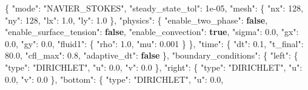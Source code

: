 \documentclass[
  10pt,
]{article}
\newenvironment{Shaded}{}{}
\newcommand{\DataTypeTok}[1]{\textcolor[rgb]{0.56,0.13,0.00}{#1}}
\newcommand{\DecValTok}[1]{\textcolor[rgb]{0.25,0.63,0.44}{#1}}
\newcommand{\FloatTok}[1]{\textcolor[rgb]{0.25,0.63,0.44}{#1}}
\newcommand{\FunctionTok}[1]{\textcolor[rgb]{0.02,0.16,0.49}{#1}}
\newcommand{\KeywordTok}[1]{\textcolor[rgb]{0.00,0.44,0.13}{\textbf{#1}}}
\newcommand{\StringTok}[1]{\textcolor[rgb]{0.25,0.44,0.63}{#1}}
\begin{document}
\begin{Shaded}
\begin{Highlighting}[]
\FunctionTok{\{}
  \DataTypeTok{"mode"}\FunctionTok{:} \StringTok{"NAVIER\_STOKES"}\FunctionTok{,}
  \DataTypeTok{"steady\_state\_tol"}\FunctionTok{:} \DecValTok{1e{-}05}\FunctionTok{,}
  \DataTypeTok{"mesh"}\FunctionTok{:} \FunctionTok{\{}
    \DataTypeTok{"nx"}\FunctionTok{:} \DecValTok{128}\FunctionTok{,}
    \DataTypeTok{"ny"}\FunctionTok{:} \DecValTok{128}\FunctionTok{,}
    \DataTypeTok{"lx"}\FunctionTok{:} \FloatTok{1.0}\FunctionTok{,}
    \DataTypeTok{"ly"}\FunctionTok{:} \FloatTok{1.0}
  \FunctionTok{\},}
  \DataTypeTok{"physics"}\FunctionTok{:} \FunctionTok{\{}
    \DataTypeTok{"enable\_two\_phase"}\FunctionTok{:} \KeywordTok{false}\FunctionTok{,}
    \DataTypeTok{"enable\_surface\_tension"}\FunctionTok{:} \KeywordTok{false}\FunctionTok{,}
    \DataTypeTok{"enable\_convection"}\FunctionTok{:} \KeywordTok{true}\FunctionTok{,}
    \DataTypeTok{"sigma"}\FunctionTok{:} \FloatTok{0.0}\FunctionTok{,}
    \DataTypeTok{"gx"}\FunctionTok{:} \FloatTok{0.0}\FunctionTok{,}
    \DataTypeTok{"gy"}\FunctionTok{:} \FloatTok{0.0}\FunctionTok{,}
    \DataTypeTok{"fluid1"}\FunctionTok{:} \FunctionTok{\{}
      \DataTypeTok{"rho"}\FunctionTok{:} \FloatTok{1.0}\FunctionTok{,}
      \DataTypeTok{"mu"}\FunctionTok{:} \FloatTok{0.001}
    \FunctionTok{\}}
  \FunctionTok{\},}
  \DataTypeTok{"time"}\FunctionTok{:} \FunctionTok{\{}
    \DataTypeTok{"dt"}\FunctionTok{:} \FloatTok{0.1}\FunctionTok{,}
    \DataTypeTok{"t\_final"}\FunctionTok{:} \FloatTok{80.0}\FunctionTok{,}
    \DataTypeTok{"cfl\_max"}\FunctionTok{:} \FloatTok{0.8}\FunctionTok{,}
    \DataTypeTok{"adaptive\_dt"}\FunctionTok{:} \KeywordTok{false}
  \FunctionTok{\},}
  \DataTypeTok{"boundary\_conditions"}\FunctionTok{:} \FunctionTok{\{}
    \DataTypeTok{"left"}\FunctionTok{:} \FunctionTok{\{}
      \DataTypeTok{"type"}\FunctionTok{:} \StringTok{"DIRICHLET"}\FunctionTok{,}
      \DataTypeTok{"u"}\FunctionTok{:} \FloatTok{0.0}\FunctionTok{,}
      \DataTypeTok{"v"}\FunctionTok{:} \FloatTok{0.0}
    \FunctionTok{\},}
    \DataTypeTok{"right"}\FunctionTok{:} \FunctionTok{\{}
      \DataTypeTok{"type"}\FunctionTok{:} \StringTok{"DIRICHLET"}\FunctionTok{,}
      \DataTypeTok{"u"}\FunctionTok{:} \FloatTok{0.0}\FunctionTok{,}
      \DataTypeTok{"v"}\FunctionTok{:} \FloatTok{0.0}
    \FunctionTok{\},}
    \DataTypeTok{"bottom"}\FunctionTok{:} \FunctionTok{\{}
      \DataTypeTok{"type"}\FunctionTok{:} \StringTok{"DIRICHLET"}\FunctionTok{,}
      \DataTypeTok{"u"}\FunctionTok{:} \FloatTok{0.0}\FunctionTok{,}

\end{Highlighting}
\end{Shaded}
\end{document}
